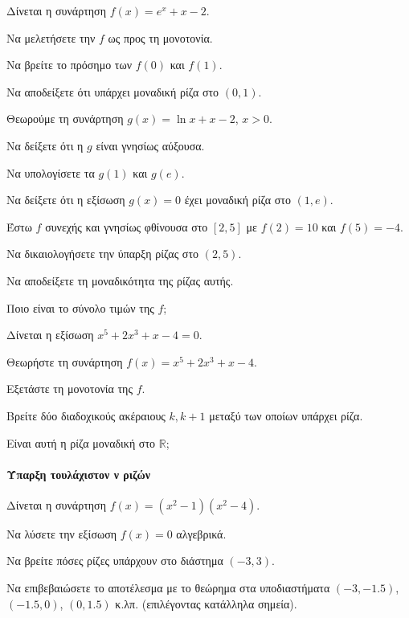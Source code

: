 \documentclass[11pt,a4paper,modern]{FFExercises}
\begin{document}
\askhsh
Δίνεται η συνάρτηση $f(x)=e^x + x - 2$.
\begin{alist}
    \item Να μελετήσετε την $f$ ως προς τη μονοτονία.
    \item Να βρείτε το πρόσημο των $f(0)$ και $f(1)$.
    \item Να αποδείξετε ότι υπάρχει μοναδική ρίζα στο $(0,1)$.
\end{alist}

\askhsh
Θεωρούμε τη συνάρτηση $g(x)=\ln x + x - 2$, $x>0$.
\begin{alist}
    \item Να δείξετε ότι η $g$ είναι γνησίως αύξουσα.
    \item Να υπολογίσετε τα $g(1)$ και $g(e)$.
    \item Να δείξετε ότι η εξίσωση $g(x)=0$ έχει μοναδική ρίζα στο $(1, e)$.
\end{alist}

\askhsh
Έστω $f$ συνεχής και γνησίως φθίνουσα στο $[2, 5]$ με $f(2)=10$ και $f(5)=-4$.
\begin{alist}
    \item Να δικαιολογήσετε την ύπαρξη ρίζας στο $(2,5)$.
    \item Να αποδείξετε τη μοναδικότητα της ρίζας αυτής.
    \item Ποιο είναι το σύνολο τιμών της $f$;
\end{alist}

\askhsh
Δίνεται η εξίσωση $x^5 + 2x^3 + x - 4 = 0$.
\begin{alist}
    \item Θεωρήστε τη συνάρτηση $f(x) = x^5 + 2x^3 + x - 4$.
    \item Εξετάστε τη μονοτονία της $f$.
    \item Βρείτε δύο διαδοχικούς ακέραιους $k, k+1$ μεταξύ των οποίων υπάρχει ρίζα.
    \item Είναι αυτή η ρίζα μοναδική στο $\mathbb{R}$;
\end{alist}
\paragraph{Ύπαρξη τουλάχιστον ν ριζών}
\askhsh
Δίνεται η συνάρτηση $f(x) = (x^2-1)(x^2-4)$.
\begin{alist}
    \item Να λύσετε την εξίσωση $f(x)=0$ αλγεβρικά.
    \item Να βρείτε πόσες ρίζες υπάρχουν στο διάστημα $(-3, 3)$.
    \item Να επιβεβαιώσετε το αποτέλεσμα με το θεώρημα  στα υποδιαστήματα $(-3, -1.5)$, $(-1.5, 0)$, $(0, 1.5)$ κ.λπ. (επιλέγοντας κατάλληλα σημεία).
\end{alist}
\end{document}
